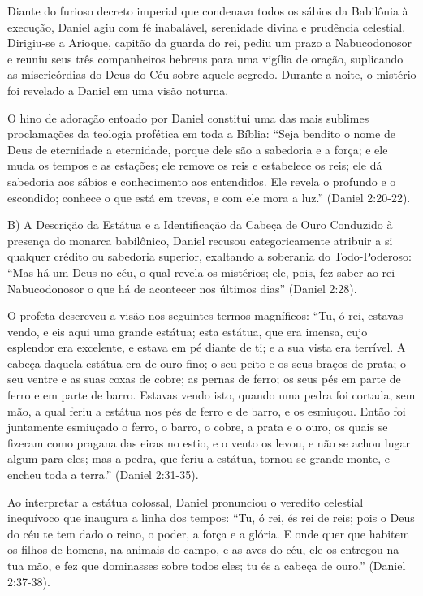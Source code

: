 \documentclass[11pt,a4paper,openany]{book}
\begin{document}
Diante do furioso decreto imperial que condenava todos os sábios da Babilônia à execução, Daniel agiu com fé inabalável, serenidade divina e prudência celestial. Dirigiu-se a Arioque, capitão da guarda do rei, pediu um prazo a Nabucodonosor e reuniu seus três companheiros hebreus para uma vigília de oração, suplicando as misericórdias do Deus do Céu sobre aquele segredo. Durante a noite, o mistério foi revelado a Daniel em uma visão noturna.

O hino de adoração entoado por Daniel constitui uma das mais sublimes proclamações da teologia profética em toda a Bíblia:
``Seja bendito o nome de Deus de eternidade a eternidade, porque dele são a sabedoria e a força; e ele muda os tempos e as estações; ele remove os reis e estabelece os reis; ele dá sabedoria aos sábios e conhecimento aos entendidos. Ele revela o profundo e o escondido; conhece o que está em trevas, e com ele mora a luz.'' (Daniel 2:20-22).

B) A Descrição da Estátua e a Identificação da Cabeça de Ouro
Conduzido à presença do monarca babilônico, Daniel recusou categoricamente atribuir a si qualquer crédito ou sabedoria superior, exaltando a soberania do Todo-Poderoso: ``Mas há um Deus no céu, o qual revela os mistérios; ele, pois, fez saber ao rei Nabucodonosor o que há de acontecer nos últimos dias'' (Daniel 2:28).

O profeta descreveu a visão nos seguintes termos magníficos:
``Tu, ó rei, estavas vendo, e eis aqui uma grande estátua; esta estátua, que era imensa, cujo esplendor era excelente, e estava em pé diante de ti; e a sua vista era terrível. A cabeça daquela estátua era de ouro fino; o seu peito e os seus braços de prata; o seu ventre e as suas coxas de cobre; as pernas de ferro; os seus pés em parte de ferro e em parte de barro. Estavas vendo isto, quando uma pedra foi cortada, sem mão, a qual feriu a estátua nos pés de ferro e de barro, e os esmiuçou. Então foi juntamente esmiuçado o ferro, o barro, o cobre, a prata e o ouro, os quais se fizeram como pragana das eiras no estio, e o vento os levou, e não se achou lugar algum para eles; mas a pedra, que feriu a estátua, tornou-se grande monte, e encheu toda a terra.'' (Daniel 2:31-35).

Ao interpretar a estátua colossal, Daniel pronunciou o veredito celestial inequívoco que inaugura a linha dos tempos:
``Tu, ó rei, és rei de reis; pois o Deus do céu te tem dado o reino, o poder, a força e a glória. E onde quer que habitem os filhos de homens, na animais do campo, e as aves do céu, ele os entregou na tua mão, e fez que dominasses sobre todos eles; tu és a cabeça de ouro.'' (Daniel 2:37-38).
\end{document}
